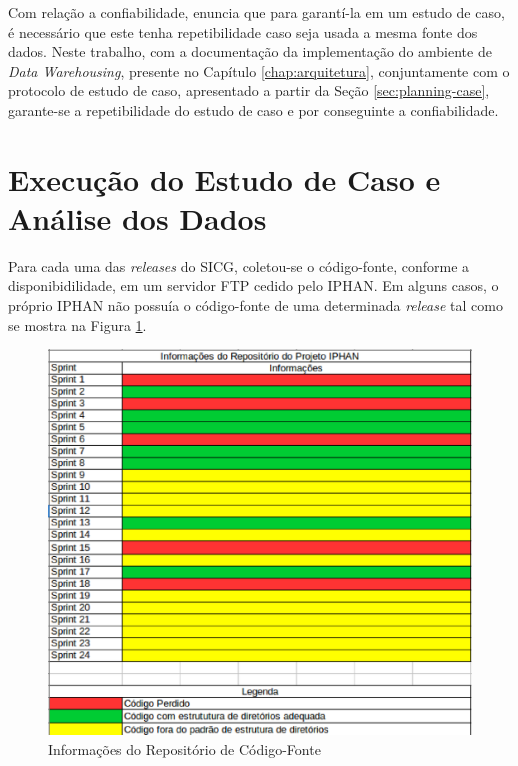 Com relação a confiabilidade,  enuncia que para garantí-la em um estudo de caso, é necessário que este tenha repetibilidade caso seja usada a mesma fonte dos dados. Neste trabalho, com a documentação da implementação do ambiente de \textit{Data Warehousing}, presente no Capítulo \ref{chap:arquitetura}, conjuntamente com o protocolo de estudo de caso, apresentado a partir da Seção \ref{sec:planning-case}, garante-se a repetibilidade do estudo de caso e por conseguinte a confiabilidade.

\section{Execução do Estudo de Caso e Análise dos Dados}
\label{sec:execution-case-study}

Para cada uma das \textit{releases} do SICG, coletou-se o código-fonte, conforme a disponibidilidade, em um servidor FTP cedido pelo IPHAN. Em alguns casos, o próprio IPHAN não possuía o código-fonte de uma determinada \textit{release} tal como se mostra na Figura \ref{fig:repositorio-IPHAN}.

\begin{figure}[ht!]
\centering
\includegraphics[keepaspectratio=true,scale=0.5]{figuras/repositorio-iphan.eps}
\caption{Informações do Repositório de Código-Fonte}
\label{fig:repositorio-IPHAN}
\end{figure}
\FloatBarrier


